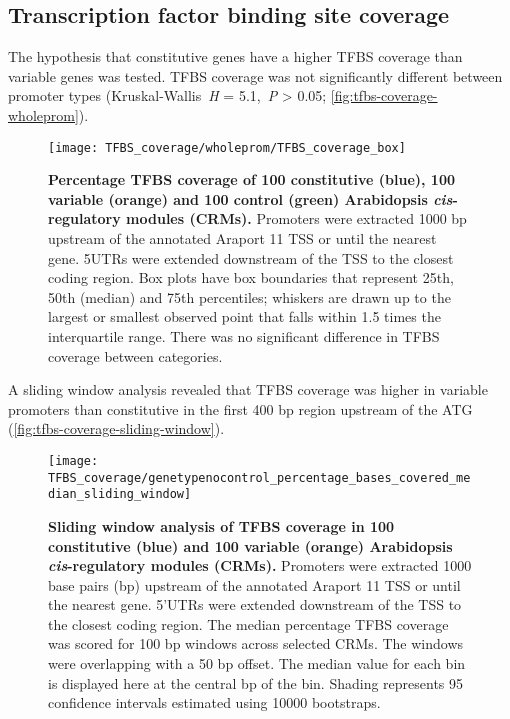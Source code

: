 \documentclass[../main.tex]{subfiles}
\begin{document}
\subsection{Transcription factor binding site coverage}
The hypothesis that constitutive genes have a higher TFBS coverage than variable genes was tested.
TFBS coverage was not significantly different between promoter types (Kruskal\hyp{}Wallis~\textit{H} = 5.1,~\textit{P} \textgreater{} 0.05; \autoref{fig:tfbs-coverage-wholeprom}).

\begin{figure}[hbt!]
	\begin{center}
		\capstart
		\texttt{[image: TFBS\_coverage/wholeprom/TFBS\_coverage\_box]}
		\caption{
			\textbf{Percentage TFBS coverage of 100 constitutive (blue), 100 variable (orange) and 100 control (green) Arabidopsis \textit{cis}\hyp{}regulatory modules (CRMs).}
			Promoters were extracted 1000 bp upstream of the annotated Araport 11 \autocite{chengAraport11CompleteReannotation2017} TSS or until the nearest gene.
			5UTRs were extended downstream of the TSS to the closest coding region.  Box plots have box boundaries that represent 25th, 50th (median) and 75th percentiles; whiskers are drawn up to the largest or smallest observed point that falls within 1.5 times the interquartile range.
			There was no significant difference in TFBS coverage between categories.
			\label{fig:tfbs-coverage-wholeprom}
		}
	\end{center}
\end{figure}

A sliding window analysis revealed that TFBS coverage was higher in variable promoters than constitutive in the first 400 bp region upstream of the ATG (\autoref{fig:tfbs-coverage-sliding-window}).

 \begin{figure}[hbt!]
	\begin{center}
		\capstart
		\texttt{[image: TFBS\_coverage/genetypenocontrol\_percentage\_bases\_covered\_median\_sliding\_window]}
		\caption{
			\textbf{Sliding window analysis of TFBS coverage in 100 constitutive (blue) and 100 variable (orange) Arabidopsis \textit{cis}\hyp{}regulatory modules (CRMs).}
			Promoters were extracted 1000 base pairs (bp) upstream of the annotated Araport 11 \autocite{chengAraport11CompleteReannotation2017} TSS or until the nearest gene.
			5'UTRs were extended downstream of the TSS to the closest coding region.
			The median percentage TFBS coverage was scored for 100 bp windows across selected CRMs.
			The windows were overlapping with a 50 bp offset.
			The median value for each bin is displayed here at the central bp of the bin.
			Shading represents 95 confidence intervals estimated using 10000 bootstraps.
			\label{fig:tfbs-coverage-sliding-window}
		}
	\end{center}
\end{figure}
\end{document}
